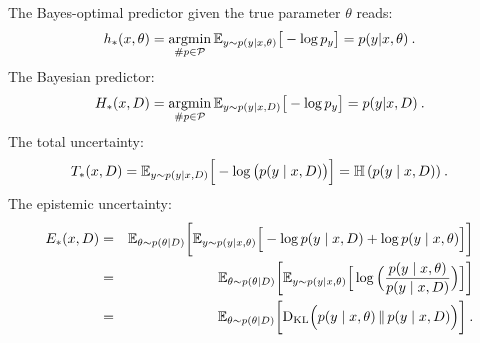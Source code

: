 The Bayes-optimal predictor given the true parameter $\theta$ reads:
\[
   h_*(x,\theta) = \mathop{\rm argmin}_{\#p\in{\cal P}} {\mathbb{E}}_{y\sim p(y|x,\theta)} \big [-\log p_y \big ] = p(y|x,\theta) \:.
\]
%
The Bayesian predictor:
\[
   H_*(x,D) =\mathop{\rm argmin}_{\#p\in{\cal P}} {\mathbb{E}}_{y\sim p(y|x,D)} \big [-\log p_y \big ] = p(y|x,D)\:.
\]
%
The total uncertainty:
\[
  T_*(x,D) = {\mathbb{E}}_{y\sim p(y\mid x,D)}\Big [-\log \big (p(y\mid x,D)\big) \Big] = {\mathbb{H}\left ( { p(y\mid x,D) } \right ) }\:.
\]
%
The epistemic uncertainty:
\begin{eqnarray*}
  E_*(x,D) & = & {\mathbb{E}}_{\theta \sim p(\theta|D)} \bigg [{\mathbb{E}}_{y\sim p(y | x,\theta)} 
    \Big [
       -\log p(y\mid x,D) + \log p(y\mid x,\theta )
    \Big ]
  \bigg ]\\
  & = & {\mathbb{E}}_{\theta \sim p(\theta|D)} \bigg [{\mathbb{E}}_{y\sim p(y | x,\theta)} 
    \Big [ \log \Big ( \frac{p(y\mid x,\theta )}{p(y\mid x,D)} \Big )
    \Big ] \bigg ]\\
    & =& {\mathbb{E}}_{\theta \sim p(\theta|D)} \bigg [
    {\rm D}_{\rm KL}\Big (p(y\mid x,\theta ) \,\|\,p(y\mid x,D) \Big )
    \bigg ]\:.
\end{eqnarray*}
